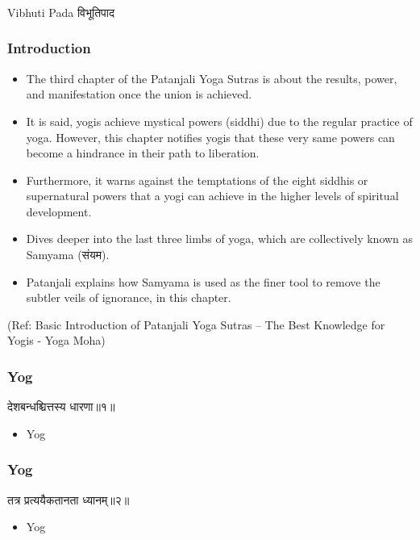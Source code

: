 \begin{frame}[fragile]\frametitle{}
\begin{center}
{\Large Vibhuti Pada विभूतिपाद}
\end{center}
\end{frame}


\begin{frame}[fragile]\frametitle{Introduction}


	\begin{itemize}
	\item The third chapter of the Patanjali Yoga Sutras is about the results, power, and manifestation once the union is achieved. 
		\item It is said, yogis achieve mystical powers (siddhi) due to the regular practice of yoga. However, this chapter notifies yogis that these very same powers can become a hindrance in their path to liberation. 
			\item Furthermore, it warns against the temptations of the eight siddhis or supernatural powers that a yogi can achieve in the higher levels of spiritual development.
	\item Dives deeper into the last three limbs of yoga, which are collectively known as Samyama (संयम).
	\item Patanjali explains how Samyama is used as the finer tool to remove the subtler veils of ignorance, in this chapter.
	\end{itemize}

\tiny{(Ref: Basic Introduction of Patanjali Yoga Sutras – The Best Knowledge for Yogis - Yoga Moha)}

\end{frame}


\begin{frame}[fragile]\frametitle{Yog}
\begin{sanskrit}
देशबन्धश्चित्तस्य धारणा॥१॥
\end{sanskrit}
	\begin{itemize}
	\item Yog 
	\end{itemize}
\end{frame}

\begin{frame}[fragile]\frametitle{Yog}
\begin{sanskrit}
तत्र प्रत्ययैकतानता ध्यानम्॥२॥
\end{sanskrit}
	\begin{itemize}
	\item Yog 
	\end{itemize}
\end{frame}



